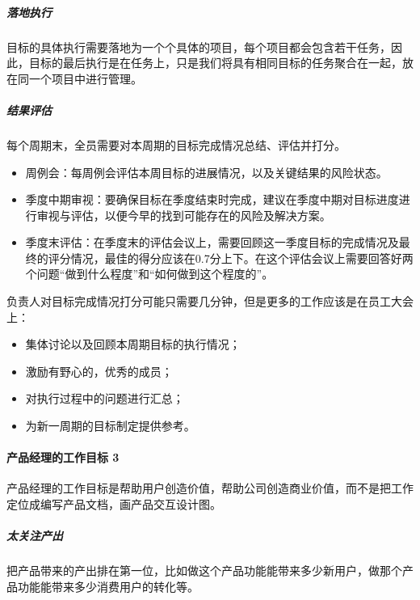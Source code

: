 \documentclass[letterpaper,10pt,english]{sphinxmanual}
\begin{document}
\subparagraph{落地执行}
\label{\detokenize{chapter_idea/goal:id2}}
目标的具体执行需要落地为一个个具体的项目，每个项目都会包含若干任务，因此，目标的最后执行是在任务上，只是我们将具有相同目标的任务聚合在一起，放在同一个项目中进行管理。


\subparagraph{结果评估}
\label{\detokenize{chapter_idea/goal:id3}}
每个周期末，全员需要对本周期的目标完成情况总结、评估并打分。
\begin{itemize}
\item {} 
周例会：每周例会评估本周目标的进展情况，以及关键结果的风险状态。

\item {} 
季度中期审视：要确保目标在季度结束时完成，建议在季度中期对目标进度进行审视与评估，以便今早的找到可能存在的风险及解决方案。

\item {} 
季度末评估：在季度末的评估会议上，需要回顾这一季度目标的完成情况及最终的评分情况，最佳的得分应该在0.7分上下。在这个评估会议上需要回答好两个问题“做到什么程度”和“如何做到这个程度的”。

\end{itemize}

负责人对目标完成情况打分可能只需要几分钟，但是更多的工作应该是在员工大会上：
\begin{itemize}
\item {} 
集体讨论以及回顾本周期目标的执行情况；

\item {} 
激励有野心的，优秀的成员；

\item {} 
对执行过程中的问题进行汇总；

\item {} 
为新一周期的目标制定提供参考。

\end{itemize}


\paragraph{产品经理的工作目标 3\sphinxfootnotemark[423]}
\label{\detokenize{chapter_idea/goal:id4}}%
\begin{footnotetext}[423]\sphinxAtStartFootnote
{}
%
\end{footnotetext}\ignorespaces 
产品经理的工作目标是帮助用户创造价值，帮助公司创造商业价值，而不是把工作定位成编写产品文档，画产品交互设计图。


\subparagraph{太关注产出}
\label{\detokenize{chapter_idea/goal:id5}}
把产品带来的产出排在第一位，比如做这个产品功能能带来多少新用户，做那个产品功能能带来多少消费用户的转化等。
\end{document}
